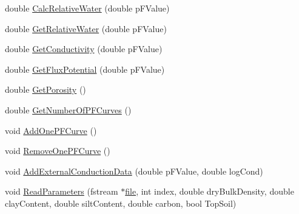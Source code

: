 \begin{DoxyCompactItemize}
\item 
double \hyperlink{classp_f___curve___implementation_af27422ac8aa7464a5895cab20d44642b}{CalcRelativeWater} (double pFValue)
\item 
double \hyperlink{classp_f___curve___implementation_aec0be188214cdef70e5b56c1a4af4889}{GetRelativeWater} (double pFValue)
\item 
double \hyperlink{classp_f___curve___implementation_abefa0a2ca31acc282ec9f0ec0d478fa0}{GetConductivity} (double pFValue)
\item 
double \hyperlink{classp_f___curve___implementation_a4bbf84d9bb853260ab867467e6f9b739}{GetFluxPotential} (double pFValue)
\item 
double \hyperlink{classp_f___curve___implementation_a25faa888ce16f43ff602c46721f8487d}{GetPorosity} ()
\item 
double \hyperlink{classp_f___curve___implementation_a5728a4c645edd079e83517c862f367b3}{GetNumberOfPFCurves} ()
\item 
void \hyperlink{classp_f___curve___implementation_a574f0de0c3a61c10ad50c2818b824840}{AddOnePFCurve} ()
\item 
void \hyperlink{classp_f___curve___implementation_a90613f53c0a26185ecceccaff4c56668}{RemoveOnePFCurve} ()
\item 
void \hyperlink{classp_f___curve___implementation_a735d822ebddc7ff3ef79549047882881}{AddExternalConductionData} (double pFValue, double logCond)
\item 
void \hyperlink{classp_f___curve___implementation_a86f7e116cbf225b8094ffc0738684bc4}{ReadParameters} (fstream $\ast$\hyperlink{classbase_a3af52ee9891719d09b8b19b42450b6f6}{file}, int index, double dryBulkDensity, double clayContent, double siltContent, double carbon, bool TopSoil)
\end{DoxyCompactItemize}



